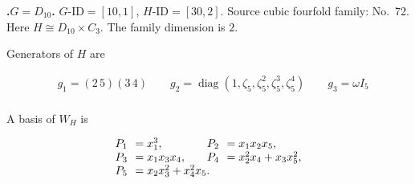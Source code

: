\documentclass[12pt]{amsart}
\makeatletter
\numberwithin{equation}{section}
\theoremstyle{plain}
\theoremstyle{definition}
\theoremstyle{remark}
\DeclareMathOperator{\diag}{diag}
\newcommand{\PBasisLabel}[1]{\mathrlap{P_{#1}}\phantom{P_{99}}}
\newenvironment{SecEightAlignedBasis}[1]{%
  \begingroup\renewcommand{\arraystretch}{1.18}%
  \[\begin{array}{@{}#1@{}}%
}{\end{array}\]\endgroup}
\newenvironment{familydisplay}{%
  \begingroup
  \setlength{\arraycolsep}{1.35pt}%
  \renewcommand{\arraystretch}{0.96}%
  \setlength{\jot}{2pt}%
}{\endgroup}
\makeatother
\begin{document}
\par{}\medskip\noindent\textbf{.\enspace $G=D_{10}$.}\label{fam:threefold-no-18}
$G\text{-ID}=[10,1]$, $H\text{-ID}=[30,2]$.
Source cubic fourfold family: No.~72.  Here
$H\cong D_{10}\times C_3$.
The family dimension is $2$.
\par\smallskip\noindent Generators of $H$ are\par\nopagebreak
\begin{familydisplay}
\begin{align*}
&g_{1}=(2\,5)(3\,4)\qquad
g_{2}=\diag(1,\zeta_5,\zeta_5^2,\zeta_5^3,\zeta_5^4)\qquad g_{3}=\omega I_5\\
\end{align*}
\end{familydisplay}
\par\smallskip\noindent A basis of $W_H$ is\par\nopagebreak
\begin{familydisplay}
\begin{SecEightAlignedBasis}{l@{\qquad}l}
\PBasisLabel{1}=x_{1}^{3}, & \PBasisLabel{2}=x_{1}x_{2}x_{5},\\
\PBasisLabel{3}=x_{1}x_{3}x_{4}, & \PBasisLabel{4}=x_{2}^{2}x_{4}+x_{3}x_{5}^{2},\\
\multicolumn{2}{@{}l@{}}{\PBasisLabel{5}=x_{2}x_{3}^{2}+x_{4}^{2}x_{5}.}
\end{SecEightAlignedBasis}
\end{familydisplay}
\end{document}
